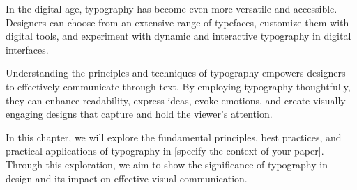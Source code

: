 In the digital age, typography has become even more versatile and accessible. Designers can choose from an extensive range of typefaces, customize them with digital tools, and experiment with dynamic and interactive typography in digital interfaces.

Understanding the principles and techniques of typography empowers designers to effectively communicate through text. By employing typography thoughtfully, they can enhance readability, express ideas, evoke emotions, and create visually engaging designs that capture and hold the viewer’s attention.

In this chapter, we will explore the fundamental principles, best practices, and practical applications of typography in [specify the context of your paper]. Through this exploration, we aim to show the significance of typography in design and its impact on effective visual communication.




